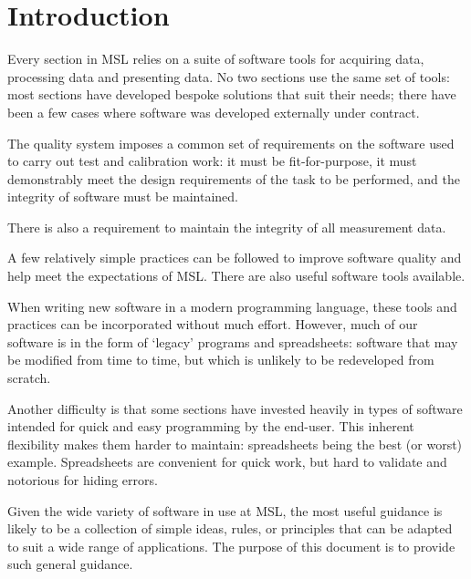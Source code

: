 \section{Introduction}

Every section in MSL relies on a suite of software tools for acquiring data, processing data and presenting data. No two sections use the same set of tools: most sections have developed bespoke solutions that suit their needs; there have been a few cases where software was developed externally under contract.  

The quality system imposes a common set of requirements on the software used to carry out test and calibration work: it must be fit-for-purpose, it must demonstrably meet the design requirements of the task to be performed, and the integrity of software must be maintained. 

There is also a requirement to maintain the integrity of all measurement data.
 
A few relatively simple practices can be followed to improve software quality and help meet the expectations of MSL. There are also useful software tools available. 

When writing new software in a modern programming language, these tools and practices can be incorporated without much effort. However, much of our software is in the form of `legacy' programs and spreadsheets: software that may be modified from time to time, but which is unlikely to be redeveloped from scratch. 

Another difficulty is that some sections have invested heavily in types of software intended for quick and easy programming by the end-user. This inherent flexibility makes them harder to maintain: spreadsheets being the best (or worst) example. Spreadsheets are convenient for quick work, but hard to validate and notorious for hiding errors.

Given the wide variety of software in use at MSL, the most useful guidance is likely to be a collection of simple ideas, rules, or principles that can be adapted to suit a wide range of applications. The purpose of this document is to provide such general guidance.
